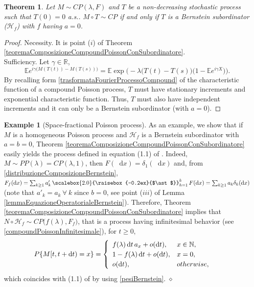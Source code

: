 \documentclass[12pt, twoside, english, headsepline]{article}
\newcommand*\dif{\mathop{}\!\mathrm{d}}  %
\newcommand{\sconv}{\mathop{\scalebox{2.0}{\raisebox{-0.2ex}{$\ast$}}}} %
\newtheorem{theorem}{Theorem}[section] %
\theoremstyle{definition} %
\newtheorem{example}{Example}[section]
\numberwithin{equation}{section} %
\begin{document}
\begin{theorem}\label{teoremaComposizioneCompoundPoissonGenerale}
	Let $M\sim CP(\lambda, F)$ and $T$ be a non-decreasing stochastic process such that $T(0) = 0$ a.s.. $M\circ T\sim CP$ if and only if $T$ is a Bernstein subordinator ($\mathcal{H}_f$) with $f$ having $a=0$. 
\end{theorem}

\begin{proof}
	Necessity. It is point ($i$) of Theorem \ref{teoremaComposizioneCompoundPoissonConSubordinatore}.
	\\
	Sufficiency. Let $\gamma\in\mathbb{R}$,
	\begin{equation}
 		\mathbb{E} e^{i\gamma \big(M(T(t))-M(T(s))\big)} = \mathbb{E} \exp\Big(-\lambda \big(T(t)-T(s)\big) \big(1-\mathbb{E}e^{i\gamma X}\big) \Big).\nonumber
	\end{equation}
	By recalling form \eqref{trasformataFourierProcessoCompound} of the characteristic function of a compound Poisson process, $T$ must have stationary increments and exponential characteristic function. Thus, $T$ must also have independent increments and it can only be a Bernstein subordinator (with $a=0$).
\end{proof}

\begin{example}[Space-fractional Poisson process]
	As an example, we show that if $M$ is a homogeneous Poisson process and $\mathcal{H}_f$ is a Bernstein subordinator with $a=b=0$, Theorem \ref{teoremaComposizioneCompoundPoissonConSubordinatore} easily yields the process defined in equation (1.1) of \cite{OT2015}. Indeed, $M\sim PP(\lambda) = CP(\lambda, 1)$, then $F(\dif x) = \delta_{1}(\dif x)$ and, from \eqref{distribuzioneComposizioneBernstein}, $F_f(\dif x) = \sum_{k\ge1} a'_k \sconv_{h=1}^k F(\dif x) = \sum_{k\ge1} a_k \delta_k(\dif x)$ (note that $a'_k = a_k\ \forall\ k$ since $b=0$, see point ($iii$) of Lemma \ref{lemmaEquazioneOperatorialeBernstein}). Therefore, Theorem \ref{teoremaComposizioneCompoundPoissonConSubordinatore} implies that $N\circ \mathcal{H}_f \sim CP\big(f(\lambda), F_f\big)$, that is a process having infinitesimal behavior (see \eqref{compoundPoissonInfinitesimale}), for $t\ge0$,
	\begin{align*}
		P\{M[t,t+\dif t)  = x\} = \begin{cases}
			\begin{array}{l l}
				f(\lambda)\dif t \,a_x + o(\dif t), & x\in\mathbb{N},\\
				1-f(\lambda)\dif t + o(\dif t), & x = 0,\\
				o(\dif t), & otherwise,
			\end{array}
		\end{cases}
	\end{align*}
	which coincides with (1.1) of \cite{OT2015} by using \eqref{pesiBernstein}. \hfill$\diamond$
\end{example}
\end{document}

